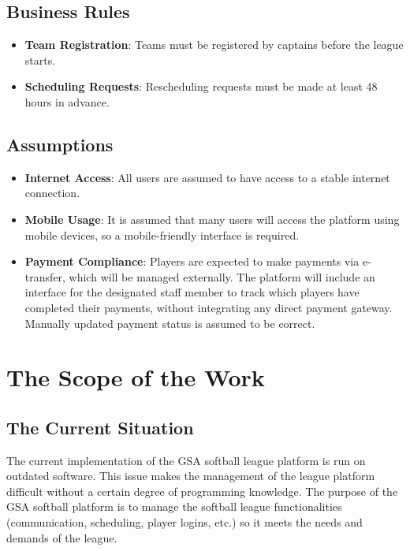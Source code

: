 \documentclass[12pt]{article}
\begin{document}
\subsection{Business Rules}
\begin{itemize}
    \item \textbf{Team Registration}: Teams must be registered by captains before the league starts.
    \item \textbf{Scheduling Requests}: Rescheduling requests must be made at least 48 hours in advance.
\end{itemize}

\subsection{Assumptions}
\begin{itemize}
    \item \textbf{Internet Access}: All users are assumed to have access to a stable internet connection.
    \item \textbf{Mobile Usage}: It is assumed that many users will access the platform using mobile devices, so a mobile-friendly interface is required.
    \item \textbf{Payment Compliance}: Players are expected to make payments via e-transfer, which will be managed externally. The platform will include an interface for the designated staff member to track which players have completed their payments, without integrating any direct payment gateway. Manually updated payment status is assumed to be correct.
\end{itemize}

\section{The Scope of the Work}
\subsection{The Current Situation}
The current implementation of the GSA softball league platform is run on outdated software.
This issue makes the management of the league platform difficult without a certain degree of
programming knowledge. The purpose of the GSA softball platform is to manage the softball
league functionalities (communication, scheduling, player logins, etc.) so it meets the needs
and demands of the league.
\end{document}
